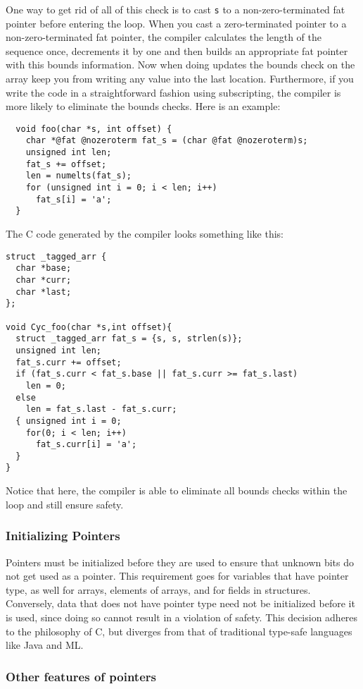 One way to get rid of all of this check is to cast \texttt{s}
to a non-zero-terminated fat pointer before entering the loop.
When you cast a zero-terminated pointer to a non-zero-terminated
fat pointer, the compiler calculates the length of the sequence
once, decrements it by one and then builds an appropriate
fat pointer with this bounds information.  Now when doing 
updates the bounds check on the array keep you from writing
any value into the last location.  Furthermore, if you write
the code in a straightforward fashion using subscripting,
the compiler is more likely to eliminate the bounds checks.
Here is an example:
\begin{verbatim}
  void foo(char *s, int offset) {
    char *@fat @nozeroterm fat_s = (char @fat @nozeroterm)s;
    unsigned int len; 
    fat_s += offset;
    len = numelts(fat_s);    
    for (unsigned int i = 0; i < len; i++)
      fat_s[i] = 'a';
  }
\end{verbatim}
The C code generated by the compiler looks something like this:      
\begin{verbatim}
struct _tagged_arr { 
  char *base;
  char *curr;
  char *last;
};

void Cyc_foo(char *s,int offset){
  struct _tagged_arr fat_s = {s, s, strlen(s)};
  unsigned int len;
  fat_s.curr += offset;
  if (fat_s.curr < fat_s.base || fat_s.curr >= fat_s.last) 
    len = 0;
  else 
    len = fat_s.last - fat_s.curr;
  { unsigned int i = 0;
    for(0; i < len; i++)
      fat_s.curr[i] = 'a';
  }
}
\end{verbatim}
Notice that here, the compiler is able to eliminate all bounds
checks within the loop and still ensure safety.

\subsubsection*{Initializing Pointers}

Pointers must be initialized before they are used to ensure that unknown
bits do not get used as a pointer.  This requirement goes for
variables that have pointer type, as well for arrays, elements of arrays,
and for fields in structures.  Conversely, data that does not have pointer
type need not be initialized before it is used, since doing so cannot result
in a violation of safety.  This decision adheres to the philosophy of C, but
diverges from that of traditional type-safe languages like Java and ML.

\subsubsection*{Other features of pointers}

